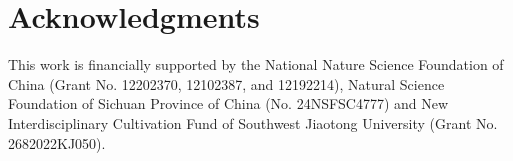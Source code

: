 \documentclass[final,times,fleqn,11pt]{elsarticle}
\begin{document}







\section*{Acknowledgments}
This work is financially supported by the National Nature Science Foundation of China (Grant No. 12202370, 12102387, and 12192214), Natural Science Foundation of Sichuan Province of China (No. 24NSFSC4777) and New Interdisciplinary Cultivation Fund of Southwest Jiaotong University (Grant No. 2682022KJ050).

\appendix




\end{document}
